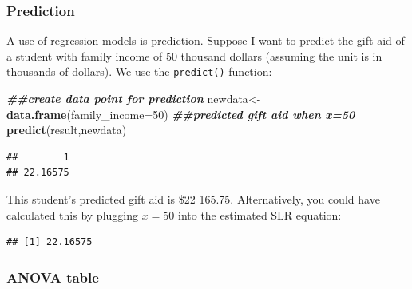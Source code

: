 \documentclass[
]{book}
\newenvironment{Shaded}{\begin{snugshade}}{\end{snugshade}}
\newcommand{\AttributeTok}[1]{\textcolor[rgb]{0.13,0.29,0.53}{#1}}
\newcommand{\DecValTok}[1]{\textcolor[rgb]{0.00,0.00,0.81}{#1}}
\newcommand{\DocumentationTok}[1]{\textcolor[rgb]{0.56,0.35,0.01}{\textbf{\textit{#1}}}}
\newcommand{\FunctionTok}[1]{\textcolor[rgb]{0.13,0.29,0.53}{\textbf{#1}}}
\newcommand{\NormalTok}[1]{#1}
\newcommand{\OtherTok}[1]{\textcolor[rgb]{0.56,0.35,0.01}{#1}}
\newcommand{\SpecialCharTok}[1]{\textcolor[rgb]{0.81,0.36,0.00}{\textbf{#1}}}
\begin{document}
\hypertarget{prediction}{%
\subsubsection*{Prediction}\label{prediction}}

A use of regression models is prediction. Suppose I want to predict the gift aid of a student with family income of 50 thousand dollars (assuming the unit is in thousands of dollars). We use the \texttt{predict()} function:

\begin{Shaded}
\begin{Highlighting}[]
\DocumentationTok{\#\#create data point for prediction}
\NormalTok{newdata}\OtherTok{\textless{}{-}}\FunctionTok{data.frame}\NormalTok{(}\AttributeTok{family\_income=}\DecValTok{50}\NormalTok{)}
\DocumentationTok{\#\#predicted gift aid when x=50}
\FunctionTok{predict}\NormalTok{(result,newdata)}
\end{Highlighting}
\end{Shaded}

\begin{verbatim}
##        1 
## 22.16575
\end{verbatim}

This student's predicted gift aid is \$22 165.75. Alternatively, you could have calculated this by plugging \(x=50\) into the estimated SLR equation:

\begin{Shaded}
\end{Shaded}

\begin{verbatim}
## [1] 22.16575
\end{verbatim}

\hypertarget{anova-table-1}{%
\subsubsection*{ANOVA table}\label{anova-table-1}}
\end{document}
